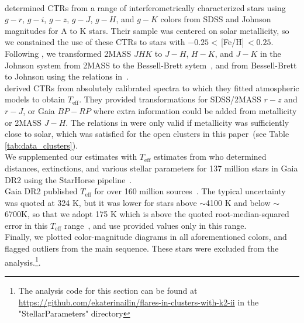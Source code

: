 \documentclass{aa}
\begin{document}
\\
\citet{boyajian_stellar_2013} determined CTRs from a range of interferometrically characterized stars using $g-r$, $g-i$, $g-z$, $g-J$, $g-H$, and $g-K$ colors from SDSS and Johnson magnitudes for A to K stars. Their sample was centered on solar metallicity, so we constained the use of these CTRs to stars with $-0.25<$\,[Fe/H]$\,<0.25$. Following \citet{boyajian_stellar_2013}, we transformed 2MASS $JHK$ to $J-H$, $H-K$, and $J-K$ in the Johnson system from 2MASS to the Bessell-Brett sytem~\citep{carpenter_color_2001}, and from Bessell-Brett to Johnson using the relations in~\citet{bessell_brett_1988}. 
\\
\citet{mann_how_2015} derived CTRs from absolutely calibrated spectra to which they fitted atmospheric models to obtain $T_\mathrm{eff}$. %
They provided transformations for SDSS/2MASS $r-z$ and $r-J$, or Gaia $BP-RP$ where extra information could be added from metallicity or 2MASS $J-H$. The relations in \citet{mann_how_2015} were only valid if metallicity was sufficiently close to solar, which was satisfied for the open clusters in this paper~(see Table \ref{tab:data_clusters}). 
\\
We supplemented our estimates with $T_\mathrm{eff}$ estimates from \citet{anders_starhorse_2019} who determined distances, extinctions, and various stellar parameters for 137 million stars in Gaia DR2 using the StarHorse pipeline~\citep{queiroz_starhorse_2018}.
\\
Gaia DR2 published $T_\mathrm{eff}$ for over 160 million sources~\citep{gaia2018}. The typical uncertainty was quoted at 324 K, but it was lower for stars above $\sim$4100 K and below $\sim$6700K, so that we adopt 175 K which is above the quoted root-median-squared error in this $T_\mathrm{eff}$ range~\citep{andrae_gaiaapsis_2018}, and use provided values only in this range.
\\ 
Finally, we plotted color-magnitude diagrams in all aforementioned colors, and flagged outliers from the main sequence. These stars were excluded from the analysis.\footnote{The analysis code for this section can be found at \url{https://github.com/ekaterinailin/flares-in-clusters-with-k2-ii} in the "StellarParameters" directory}.

\end{document}
